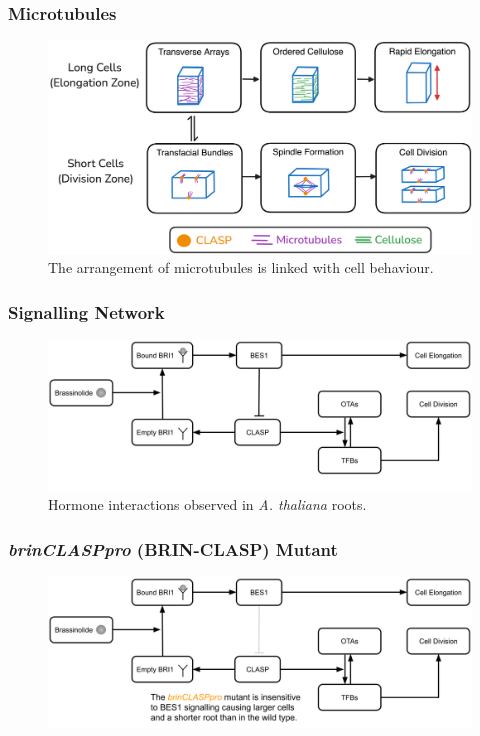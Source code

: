 \documentclass{beamer}
\begin{document}
\begin{frame}
\frametitle{Microtubules}
\begin{figure}
  \centering
  \includegraphics[width=\textwidth]{microtubule-behaviour.png}
  \caption{The arrangement of microtubules is linked with cell behaviour.}
\end{figure}
\end{frame}

\begin{frame}
\frametitle{Signalling Network}
\begin{figure}
  \centering
  \includegraphics[width=\textwidth]{network-wild-type.png}
  \caption{Hormone interactions observed in \emph{A. thaliana} roots.}
\end{figure}
\end{frame}

\begin{frame}
\frametitle{\emph{brinCLASPpro} (BRIN-CLASP) Mutant}
\begin{figure}
  \centering
  \includegraphics[width=\textwidth]{network-brin-clasp.png}
\end{figure}
\end{frame}
\end{document}

